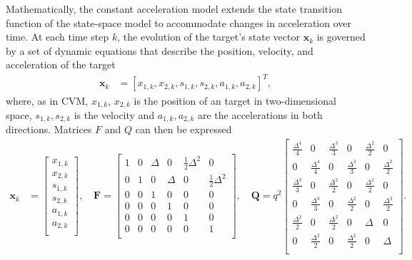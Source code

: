 Mathematically, the constant acceleration model extends the state transition function of the state-space model to
accommodate changes in acceleration over time. At each time step $k$, the evolution of the target's state vector $\mathbf{x}_k$ is governed by a set of dynamic equations that describe the position, velocity, and acceleration of the target
\begin{align}
    \mathbf{x}_k &= [x_{1,k}, x_{2,k}, s_{1,k}, s_{2,k}, a_{1,k}, a_{2,k}]^T,
\end{align}
where, as in CVM, $x_{1,k}$, $x_{2,k}$ is the position of an target in two-dimensional space, $s_{1,k}, s_{2,k}$ is
the velocity and $a_{1,k}, a_{2,k}$ are the accelerations in both directions. Matrices $F$ and $Q$ can then be expressed
\begin{align}
    \mathbf{x}_k &=
    \begin{bmatrix}
        x_{1,k} \\
        x_{2,k} \\
        s_{1,k} \\
        s_{2,k} \\
        a_{1,k} \\
        a_{2,k} \\
    \end{bmatrix},
    \quad \mathbf{F} =
    \begin{bmatrix}
        1 & 0 & \Delta & 0 & \frac{1}{2}\Delta^2 & 0\\
        0 & 1 & 0 & \Delta & 0 & \frac{1}{2}\Delta^2\\
        0 & 0 & 1 & 0 & 0 & 0\\
        0 & 0 & 0 & 1 & 0 & 0\\
        0 & 0 & 0 & 0 & 1 & 0\\
        0 & 0 & 0 & 0 & 0 & 1\\
    \end{bmatrix},
    \quad \mathbf{Q} = q^2
    \begin{bmatrix}
        \frac{\Delta^4}{4} & 0 & \frac{\Delta^3}{3} & 0 & \frac{\Delta^2}{2} & 0\\
        0 & \frac{\Delta^4}{4} & 0 & \frac{\Delta^3}{3} & 0 & \frac{\Delta^2}{2}\\
        \frac{\Delta^3}{3} & 0 & \frac{\Delta^2}{2} & 0 & \frac{\Delta^2}{2} & 0\\
        0 & \frac{\Delta^3}{3} & 0 & \frac{\Delta^2}{2} & 0 & \frac{\Delta^2}{2} \\
        \frac{\Delta^2}{2} & 0 & \frac{\Delta^2}{2} & 0 & \Delta & 0\\
        0 & \frac{\Delta^2}{2} & 0 & \frac{\Delta^2}{2} & 0 & \Delta \\
    \end{bmatrix}.
\end{align}
